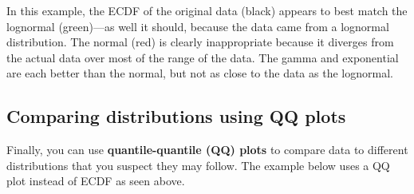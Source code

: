 \documentclass[
  13,
  letterpaper,
]{report}
\begin{document}
In this example, the ECDF of the original data (black) appears to best
match the lognormal (green)---as well it should, because the data came
from a lognormal distribution. The normal (red) is clearly inappropriate
because it diverges from the actual data over most of the range of the
data. The gamma and exponential are each better than the normal, but not
as close to the data as the lognormal.

\subsection{Comparing distributions using QQ
plots}\label{sec-dtest-fit-qq}

Finally, you can use \textbf{quantile-quantile (QQ) plots} to compare
data to different distributions that you suspect they may follow. The
example below uses a QQ plot instead of ECDF as seen above.
\end{document}
